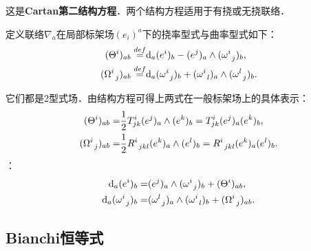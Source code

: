 这是{\heiti \bfseries Cartan第二结构方程}．两个结构方程适用于有挠或无挠联络．
\begin{definition}\label{chccr:def_TCF}
    定义联络$\nabla_a$在局部标架场$(e_i)^a$下的{\heiti 挠率型式}与{\heiti 曲率型式}如下：
    \begin{align}
        (\Theta ^{i})_{ab} \overset{def}{=} & {\rm d}_a (e^i)_b -
        (e^j)_a \wedge (\omega _{\hphantom{a} j}^i)_b , \label{chccr:eqn_Tform}\\
        (\Omega_{\hphantom{a} j} ^{i})_{ab} \overset{def}{=} & {\rm d}_a
        ( \omega _{\hphantom{a} j} ^i  )_b  + ( \omega _{\hphantom{a} l}^i )_a
        \wedge ( \omega _{\hphantom{a} j}^l )_b . \label{chccr:eqn_Cform}
    \end{align}
\end{definition}
它们都是2型式场．由结构方程可得上两式在一般标架场上的具体表示：
\begin{align}
    (\Theta ^{i})_{ab} = &\frac{1}{2}T_{jk}^i (e^j)_a \wedge(e^k)_b
    = T_{jk}^i (e^j)_a (e^k)_b, \label{chccr:eqn_Tform-bak}\\
    (\Omega_{\hphantom{a} j} ^{i})_{ab} = &\frac{1}{2}R_{\hphantom{a} jkl}^i
    (e^k)_a \wedge (e^l)_b = R_{\hphantom{a} jkl}^i (e^k)_a (e^l)_b . \label{chccr:eqn_Cform-bak}
\end{align}
：
\begin{subequations}\label{chccr:eqn_CST}
\begin{align}
    {\rm d}_a (e^i)_b =&(e^j)_a \wedge (\omega _{\hphantom{a} j}^i)_b +(\Theta ^{i})_{ab}, \label{chccr:eqn_CST-I} \\
    {\rm d}_a ( \omega _{\hphantom{a} j} ^i  )_b  =&  ( \omega _{\hphantom{a} j}^l )_a
    \wedge ( \omega _{\hphantom{a} l}^i )_b + (\Omega_{\hphantom{a} j} ^{i})_{ab} . \label{chccr:eqn_CSC-II}
\end{align}
\end{subequations}


\subsection{Bianchi恒等式}

